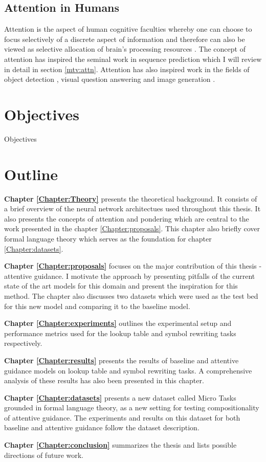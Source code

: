 \subsection{Attention in Humans} \label{intro:attn}
Attention is the aspect of human cognitive faculties whereby one can choose to focus selectively of a discrete aspect of information and therefore can also be viewed as selective allocation of brain's processing resources \citep{anderson2005cognitive}. The concept of attention has inspired the seminal work in sequence prediction \citep{Bahdanau2014} which I will review in detail in section \ref{mtv:attn}. Attention has also inspired work in the fields of object detection \citep{BaMK14}, visual question answering \citep{lu2016hierarchical} and image generation \citep{GregorDGW15}.

		
\section{Objectives}
	Objectives

	
\section{Outline}
	\textbf{Chapter \ref{Chapter:Theory}} presents the theoretical background. It consists of a brief overview of the neural network architectues used throughout this thesis. It also presents the concepts of attention and pondering which are central to the work presented in the chapter \ref{Chapter:proposals}. This chapter also briefly cover formal language theory which serves as the foundation for chapter \ref{Chapter:datasets}.
	
	\textbf{Chapter \ref{Chapter:proposals}} focuses on the major contribution of this thesis - attentive guidance. I motivate the approach by presenting pitfalls of the current state of the art models for this domain and present the inspiration for this method. The chapter also discusses two datasets which were used as the test bed for this new model and comparing it to the baseline model.  
	
	\textbf{Chapter \ref{Chapter:experiments}} outlines the experimental setup and performance metrics used for the lookup table and symbol rewriting tasks respectively.
	
	\textbf{Chapter \ref{Chapter:results}} presents the results of baseline and attentive guidance models on lookup table and symbol rewriting tasks. A comprehensive analysis of these results has also been presented in this chapter.
	
	\textbf{Chapter \ref{Chapter:datasets}} presents a new dataset called Micro Tasks grounded in formal language theory, as a new setting for testing compositionality of attentive guidance. The experiments and results on this dataset for both baseline and attentive guidance follow the dataset description.
	
	\textbf{Chapter \ref{Chapter:conclusion}} summarizes the thesis and lists possible directions of future work.


				